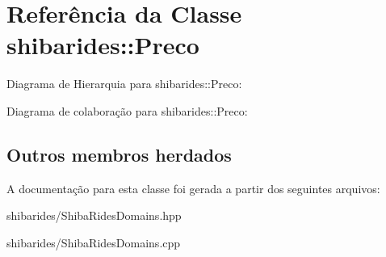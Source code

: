 \hypertarget{classshibarides_1_1Preco}{}\section{Referência da Classe shibarides\+:\+:Preco}
\label{classshibarides_1_1Preco}


Diagrama de Hierarquia para shibarides\+:\+:Preco\+:


Diagrama de colaboração para shibarides\+:\+:Preco\+:
\subsection*{Outros membros herdados}


A documentação para esta classe foi gerada a partir dos seguintes arquivos\+:\begin{DoxyCompactItemize}
\item 
shibarides/Shiba\+Rides\+Domains.\+hpp\item 
shibarides/Shiba\+Rides\+Domains.\+cpp\end{DoxyCompactItemize}
